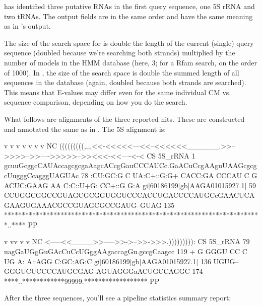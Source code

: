  has identified three putative RNAs in the first query
sequence, one 5S rRNA and two tRNAs. The output fields are in the
same order and have the same meaning as in 's output.

The size of the search space for  is double the length of
the current (single) query sequence (doubled because we're searching
both strands) multiplied by the number of models in the HMM database
(here, 3; for a Rfam search, on the order of 1000). In
, the size of the search space is double the summed
length of all sequences in the database (again, doubled because both
strands are searched). This means that E-values may differ even for
the same individual CM vs. sequence comparison, depending on how you
do the search.

What follows are alignments of the three reported hits. These are
constructed and annotated the same as in . The 5S
alignment is: 

\begin{sreoutput}
                                             v               v       v         v         v             v           v NC
                                     (((((((((,,,,<<-<<<<<---<<--<<<<<<______.>>-->>>>-->>---->>>>>-->><<<-<<----<-< CS
                         5S_rRNA   1 gcuuGcggcCAUAccagcgcgaAagcACcgGauCCCAUCc.GaACuCcgAAguUAAGcgcgcUugggCcagggUAGUAc 78 
                                     :CU:GC:G C UA:C+::G:G+   CACC:GA CCCAU C G ACUC:GAAG  AA C:C::U+G: CC+::G  G:A 
  gi|60186199|gb|AAGA01015927.1|  59 CCUGGCGGCCGUAGCGCGGUGGUCCCACCUGACCCCAUGCcGAACUCAGAAGUGAAACGCCGUAGCGCCGAUG--GUAG 135
                                     *************************************************************************..**** PP

                                     v                  vv         v v          NC
                                     <-----<<____>>----->>->-->>->>>.))))))))): CS
                         5S_rRNA  79 uagGaUGgGuGAcCuCcUGggAAgaccagGu.gccgCaagcc 119
                                      + G  GGGU  CC C UG  A: A::AGG   C:GC:AG:C
  gi|60186199|gb|AAGA01015927.1| 136 UGUG--GGGUCUCCCCAUGCGAG-AGUAGGGaACUGCCAGGC 174
                                     ****..************99999.****************** PP

\end{sreoutput}

After the three sequences, you'll see a pipeline statistics summary
report:

